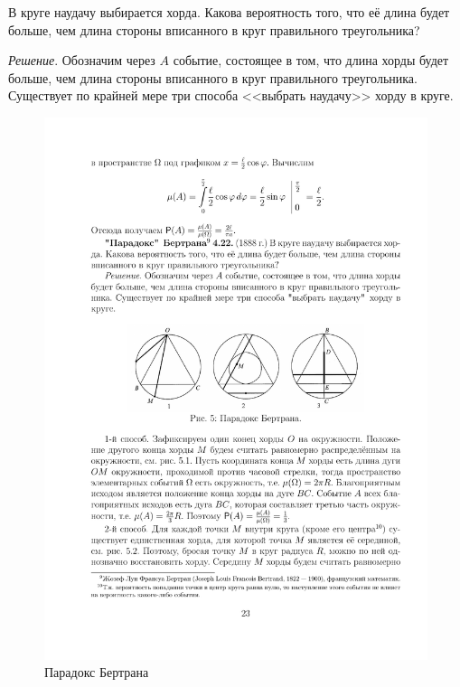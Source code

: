 \begin{example}
	
В круге наудачу выбирается хорда. Какова вероятность того, что её длина будет больше, чем длина стороны вписанного в круг правильного треугольника?

\textit{Решение}. Обозначим через $A$ событие, состоящее в том, что длина хорды будет больше, чем длина стороны вписанного в круг правильного треугольника. Существует по крайней мере три способа <<выбрать наудачу>> хорду в
круге.

\begin{figure}[h!]
	\centering
	\includegraphics[]{pic/pic5}
	\caption{Парадокс Бертрана}
	\label{fig5}
\end{figure}


\end{example}

